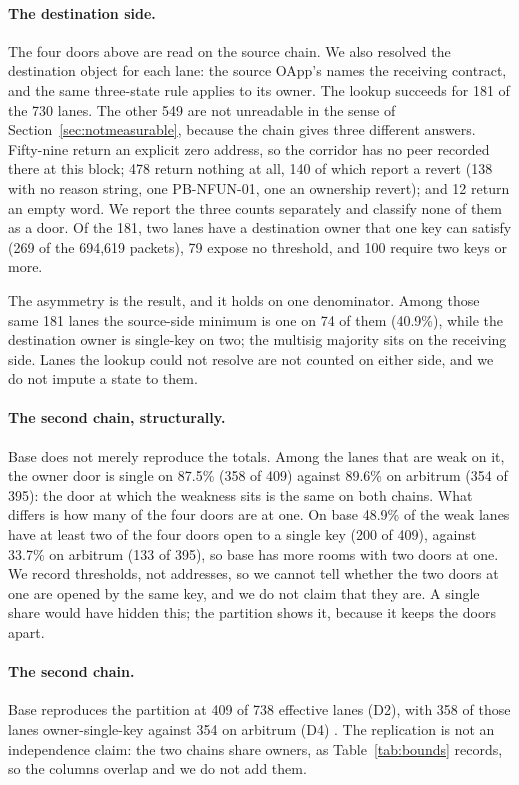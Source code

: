 \documentclass[10pt,a4paper]{article}
\newcommand{\code}[1]{\texttt{\detokenize{#1}}}
\begin{document}
\paragraph{The destination side.}
The four doors above are read on the source chain. We also resolved the destination object for each lane:
the source OApp's \code{peers(30101)} names the receiving contract, and the same three-state rule applies to
its owner. The lookup succeeds for 181 of the 730 lanes. The other 549 are not unreadable in the sense of
Section~\ref{sec:notmeasurable}, because the chain gives three different answers. Fifty-nine return an
explicit zero address, so the corridor has no peer recorded there at this block; 478 return nothing at all,
140 of which report a revert (138 with no reason string, one PB-NFUN-01, one an ownership revert); and 12
return an empty word. We report the three counts separately and classify none of them as a door. Of the 181,
two lanes have a destination owner that one key can satisfy (269 of the 694,619 packets), 79 expose no
threshold, and 100 require two keys or more.

The asymmetry is the result, and it holds on one denominator. Among those same 181 lanes the source-side
minimum is one on 74 of them (40.9\%), while the destination owner is single-key on two; the multisig
majority sits on the receiving side. Lanes the lookup could not resolve are not counted on either side, and
we do not impute a state to them.
\paragraph{The second chain, structurally.}
Base does not merely reproduce the totals. Among the lanes that are weak on it, the owner door is single on
87.5\% (358 of 409) against 89.6\% on arbitrum (354 of 395): the door at which the weakness sits is the same
on both chains. What differs is how many of the four doors are at one. On base 48.9\% of the weak lanes have at
least two of the four doors open to a single key (200 of 409), against 33.7\% on arbitrum (133 of 395), so base has more rooms with two doors at one. We record thresholds, not addresses, so we cannot tell whether the two doors at one are opened by the same key, and we do not claim that they are. A single share would have hidden this; the partition shows
it, because it keeps the doors apart.
\paragraph{The second chain.}
Base reproduces the partition at 409 of 738 effective lanes (D2), with 358 of those lanes owner-single-key
against 354 on arbitrum (D4) \code{[BASE-LANES:3]}. The replication is not an independence claim: the two chains
share owners, as Table~\ref{tab:bounds} records, so the columns overlap and we do not add them.
\end{document}
